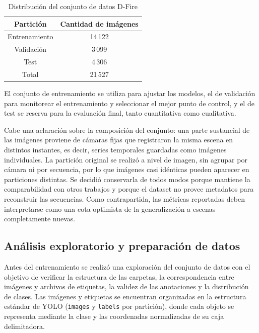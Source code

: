 \documentclass[conference]{IEEEtran}
\begin{document}
\begin{table}[htbp]
\caption{Distribución del conjunto de datos D-Fire}
\begin{center}

\begin{tabular}{|c|c|}
\hline

\textbf{Partición} &
\textbf{Cantidad de imágenes} \\

\hline

Entrenamiento & 14\,122 \\

\hline

Validación & 3\,099 \\

\hline

Test & 4\,306 \\

\hline

Total & 21\,527 \\

\hline

\end{tabular}

\label{tab:dataset_split}

\end{center}
\end{table}

El conjunto de entrenamiento se utiliza para ajustar los modelos, el de
validación para monitorear el entrenamiento y seleccionar el mejor punto de
control, y el de test se reserva para la evaluación final, tanto
cuantitativa como cualitativa.

Cabe una aclaración sobre la composición del conjunto: una parte sustancial
de las imágenes proviene de cámaras fijas que registraron la misma escena en
distintos instantes, es decir, series temporales guardadas como imágenes
individuales. La partición original se realizó a nivel de imagen, sin
agrupar por cámara ni por secuencia, por lo que imágenes casi idénticas
pueden aparecer en particiones distintas. Se decidió conservarla de todos
modos porque mantiene la comparabilidad con otros trabajos y porque el
dataset no provee metadatos para reconstruir las secuencias. Como
contrapartida, las métricas reportadas deben interpretarse como una cota
optimista de la generalización a escenas completamente nuevas.

\subsection{Análisis exploratorio y preparación de datos}\label{Preparacion_datos}
Antes del entrenamiento se realizó una exploración del conjunto de datos con
el objetivo de verificar la estructura de las carpetas, la correspondencia
entre imágenes y archivos de etiquetas, la validez de las anotaciones y la
distribución de clases. Las imágenes y etiquetas se encuentran organizadas
en la estructura estándar de YOLO (\texttt{images} y \texttt{labels} por
partición), donde cada objeto se representa mediante la clase y las
coordenadas normalizadas de su caja delimitadora.
\end{document}
